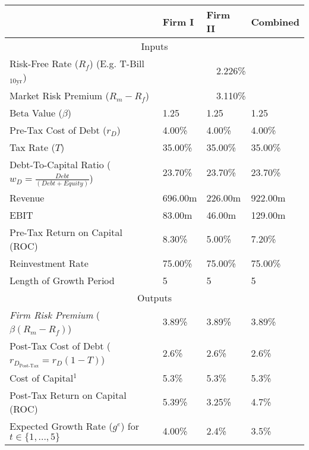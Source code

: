 \documentclass[11pt, english]{article}
\begin{document}
	\begin{center}
                \scriptsize
        \begin{longtable}{p{6.5cm}|p{1.5cm}p{1.5cm}p{1.5cm}}
                & Firm I & Firm II & Combined\\
                \hline
                \hline
                \multicolumn{4}{c}{Inputs}\\
                \hline
                \hline
                Risk-Free Rate ($R_f$) (E.g. T-Bill$_{\textrm{10yr}}$) & \multicolumn{3}{c}{2.226\%}\\
                Market Risk Premium ($R_m-R_f$) & \multicolumn{3}{c}{3.110\%}\\
                Beta Value ($\beta$) & 1.25 & 1.25 & 1.25\\
                \hline
                Pre-Tax Cost of Debt ($r_D$) & 4.00\% & 4.00\% & 4.00\%\\
                Tax Rate ($T$) & 35.00\% & 35.00\% & 35.00\%\\
                Debt-To-Capital Ratio ($w_D=\frac{Debt}{(Debt+Equity)}$) & 23.70\% & 23.70\% & 23.70\%\\
                \hline
                Revenue & 696.00m & 226.00m & 922.00m\\
                EBIT & 83.00m & 46.00m & 129.00m\\
                \hline
                Pre-Tax Return on Capital (ROC) & 8.30\% & 5.00\% & 7.20\%\\
                Reinvestment Rate & 75.00\% & 75.00\% & 75.00\%\\
                Length of Growth Period & 5 & 5 & 5\\
                \hline
                \hline
                \multicolumn{4}{c}{Outputs}\\
                \hline
                \hline
                \textit{Firm Risk Premium} ($\beta(R_m-R_f)$) & 3.89\% & 3.89\% & 3.89\%\\
                \hline
                Post-Tax Cost of Debt ($r_{D_{\textrm{Post-Tax}}}=r_D(1-T)$) & 2.6\% & 2.6\% & 2.6\%\\
                Cost of Capital$^1$ & 5.3\% & 5.3\% & 5.3\%\\
                \hline
                Post-Tax Return on Capital (ROC) & 5.39\% & 3.25\% & 4.7\%\\
                Expected Growth Rate ($g^e$) for $t\in\{1,...,5\}$ & 4.00\% & 2.4\% & 3.5\%\\

\end{longtable}
\end{center}
\end{document}
